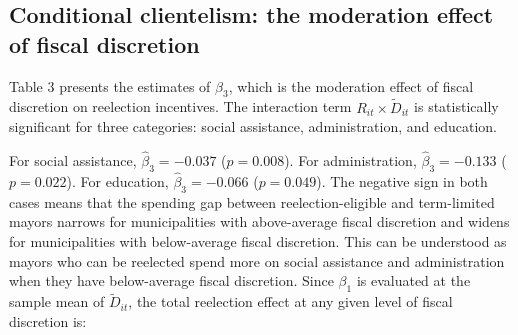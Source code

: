 \documentclass[12pt, a4paper]{article}
\begin{document}
\subsection*{Conditional clientelism: the moderation effect of fiscal discretion}

\begin{table}[htbp]
\centering
\caption{Moderation Effect of Fiscal Discretion on Reelection Incentives ($\hat{\beta}_3$)}
\label{tab:beta3}
\end{table}

Table 3 presents the estimates of $\beta_3$, which is the moderation effect of fiscal discretion on reelection incentives. The interaction term $R_{it} \times \tilde{D}_{it}$ is statistically significant for three categories: social assistance, administration, and education.

For social assistance, $\hat{\beta}_3 = -0.037$ ($p = 0.008$). For administration, $\hat{\beta}_3 = -0.133$ ($p = 0.022$). For education, $\hat{\beta}_3 = -0.066$ ($p = 0.049$). The negative sign in both cases means that the spending gap between reelection-eligible and term-limited mayors narrows for municipalities with above-average fiscal discretion and widens for municipalities with below-average fiscal discretion. This can be understood as mayors who can be reelected spend more on social assistance and administration when they have below-average fiscal discretion. Since $\beta_1$ is evaluated at the sample mean of $\tilde{D}_{it}$, the total reelection effect at any given level of fiscal discretion is:
\end{document}
